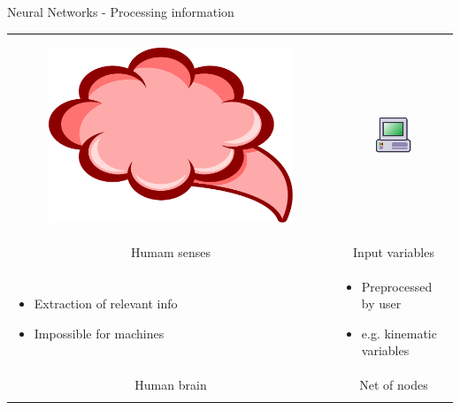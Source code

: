 \documentclass{beamer}
\begin{document}
\begin{frame}{Neural Networks - Processing information}
    \begin{tabular}{p{5cm}|p{5cm}}
        \begin{figure}
            \includegraphics[scale = 0.09]{brain}
        \end{figure}
        & 
        \begin{figure}
            \includegraphics[scale = 1.4]{machine}
        \end{figure} \\
      \multicolumn{1}{c|}{Humam senses} & \multicolumn{1}{c}{Input variables} \\
        \begin{itemize}
            \item Extraction of relevant info
            \item Impossible for machines
        \end{itemize}
        & 
        \begin{itemize}
          \item Preprocessed by user
          \item {e.g.} kinematic variables
        \end{itemize} \\
    \multicolumn{1}{c|}{Human brain} & \multicolumn{1}{c}{Net of nodes} \\
        \begin{itemize}

\end{itemize}
\end{tabular}
\end{frame}
\end{document}
